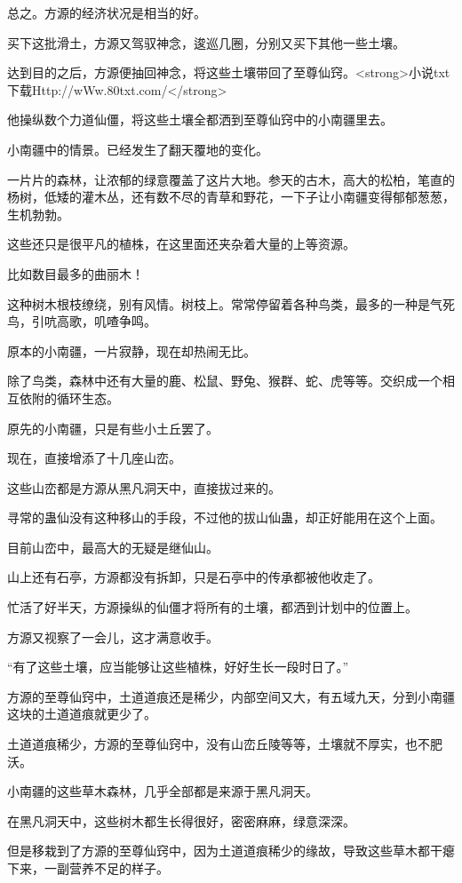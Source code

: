 \begin{this_body}
总之。方源的经济状况是相当的好。

买下这批滑土，方源又驾驭神念，逡巡几圈，分别又买下其他一些土壤。

达到目的之后，方源便抽回神念，将这些土壤带回了至尊仙窍。<strong>小说txt下载Http://wWw.80txt.com/</strong>

他操纵数个力道仙僵，将这些土壤全都洒到至尊仙窍中的小南疆里去。

小南疆中的情景。已经发生了翻天覆地的变化。

一片片的森林，让浓郁的绿意覆盖了这片大地。参天的古木，高大的松柏，笔直的杨树，低矮的灌木丛，还有数不尽的青草和野花，一下子让小南疆变得郁郁葱葱，生机勃勃。

这些还只是很平凡的植株，在这里面还夹杂着大量的上等资源。

比如数目最多的曲丽木！

这种树木根枝缭绕，别有风情。树枝上。常常停留着各种鸟类，最多的一种是气死鸟，引吭高歌，叽喳争鸣。

原本的小南疆，一片寂静，现在却热闹无比。

除了鸟类，森林中还有大量的鹿、松鼠、野兔、猴群、蛇、虎等等。交织成一个相互依附的循环生态。

原先的小南疆，只是有些小土丘罢了。

现在，直接增添了十几座山峦。

这些山峦都是方源从黑凡洞天中，直接拔过来的。

寻常的蛊仙没有这种移山的手段，不过他的拔山仙蛊，却正好能用在这个上面。

目前山峦中，最高大的无疑是继仙山。

山上还有石亭，方源都没有拆卸，只是石亭中的传承都被他收走了。

忙活了好半天，方源操纵的仙僵才将所有的土壤，都洒到计划中的位置上。

方源又视察了一会儿，这才满意收手。

“有了这些土壤，应当能够让这些植株，好好生长一段时日了。”

方源的至尊仙窍中，土道道痕还是稀少，内部空间又大，有五域九天，分到小南疆这块的土道道痕就更少了。

土道道痕稀少，方源的至尊仙窍中，没有山峦丘陵等等，土壤就不厚实，也不肥沃。

小南疆的这些草木森林，几乎全部都是来源于黑凡洞天。

在黑凡洞天中，这些树木都生长得很好，密密麻麻，绿意深深。

但是移栽到了方源的至尊仙窍中，因为土道道痕稀少的缘故，导致这些草木都干瘪下来，一副营养不足的样子。


\end{this_body}
